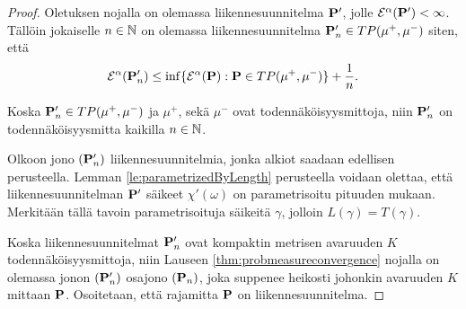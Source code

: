 \documentclass[12pt,oneside,a4paper]{amsbook} %
\begin{document}
\begin{proof}
    
    Oletuksen nojalla on olemassa liikennesuunnitelma $\P'$, jolle $\E^\alpha(\P') < \infty$.
    Tällöin jokaiselle $n\in\N$ on olemassa liikennesuunnitelma $\P_n'\in TP(\mu^+, \mu^-)$ siten, että 
        \begin{equation*}
            \E^\alpha(\P_n') \le \inf \{\E^\alpha(\P): \P\in TP(\mu^+, \mu^-)\} + \frac{1}{n}.
        \end{equation*}
    
    Koska $\P_n' \in TP(\mu^+, \mu^-)$ ja $\mu^+$, sekä $\mu^-$ ovat todennäköisyysmittoja, niin $\P_n'$ on todennäköisyysmitta kaikilla $n \in \N$.
    
    Olkoon jono $(\P_n')$ liikennesuunnitelmia, jonka alkiot saadaan edellisen perusteella. Lemman \ref{le:parametrizedByLength} perusteella voidaan olettaa, että liikennesuunnitelman $\P'$ säikeet $\chi'(\omega)$ on parametrisoitu pituuden mukaan. Merkitään tällä tavoin parametrisoituja säikeitä $\gamma$, jolloin $L(\gamma) = T(\gamma)$. 
    
    Koska liikennesuunnitelmat $\P_n'$ ovat kompaktin metrisen avaruuden $K$ todennäköisyysmittoja, niin Lauseen \ref{thm:probmeasureconvergence} nojalla on olemassa jonon $(\P_n')$ osajono $(\P_n)$, joka suppenee heikosti johonkin avaruuden $K$ mittaan $\P$. Osoitetaan, että rajamitta $\P$ on liikennesuunnitelma.
    

\end{proof}
\end{document}

